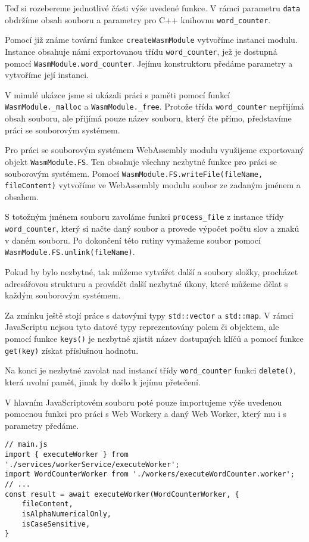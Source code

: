 \documentclass{{template/ctuthesis}}
\begin{document}
Teď si rozebereme jednotlivé části výše uvedené funkce. V rámci parametru \texttt{data} obdržíme obsah souboru a parametry pro C++ knihovnu \texttt{word\_counter}.

Pomocí již známe tovární funkce \texttt{createWasmModule} vytvoříme instanci modulu. Instance obsahuje námi exportovanou třídu \texttt{word\_counter}, jež je dostupná pomocí \texttt{WasmModule.word\_counter}. Jejímu konstruktoru předáme parametry a vytvoříme její instanci.

V minulé ukázce jsme si ukázali práci s paměti pomocí funkcí \texttt{WasmModule.\_malloc} a \texttt{WasmModule.\_free}. Protože třída \texttt{word\_counter} nepřijímá obsah souboru, ale přijímá pouze název souboru, který čte přímo, představíme práci se souborovým systémem.

Pro práci se souborovým systémem WebAssembly modulu využijeme exportovaný objekt \texttt{WasmModule.FS}. Ten obsahuje všechny nezbytné funkce pro práci se souborovým systémem. Pomocí \texttt{WasmModule.FS.writeFile(fileName, fileContent)} vytvoříme ve WebAssembly modulu soubor ze zadaným jménem a obsahem.

S totožným jménem souboru zavoláme funkci \texttt{process\_file} z instance třídy \texttt{word\_counter}, který si načte daný soubor a provede výpočet počtu slov a znaků v daném souboru. Po dokončení této rutiny vymažeme soubor pomocí \texttt{WasmModule.FS.unlink(fileName)}.

Pokud by bylo nezbytné, tak můžeme vytvářet další a soubory složky, procházet adresářovou strukturu a provádět další nezbytné úkony, které můžeme dělat s každým souborovým systémem.

Za zmínku ještě stojí práce s datovými typy \texttt{std::vector} a \texttt{std::map}. V rámci JavaScriptu nejsou tyto datové typy reprezentovány polem či objektem, ale pomocí funkce \texttt{keys()} je nezbytné zjistit název dostupných klíčů a pomocí funkce \texttt{get(key)} získat příslušnou hodnotu.

Na konci je nezbytné zavolat nad instancí třídy \texttt{word\_counter} funkci \texttt{delete()}, která uvolní paměť, jinak by došlo k jejímu přetečení.

V hlavním JavaScriptovém souboru poté pouze importujeme výše uvedenou pomocnou funkci pro práci s Web Workery a daný Web Worker, který mu i s parametry předáme.

\begin{verbatim}
// main.js
import { executeWorker } from './services/workerService/executeWorker';
import WordCounterWorker from './workers/executeWordCounter.worker';
// ...
const result = await executeWorker(WordCounterWorker, {
    fileContent,
    isAlphaNumericalOnly,
    isCaseSensitive,
}
\end{verbatim}
\end{document}
